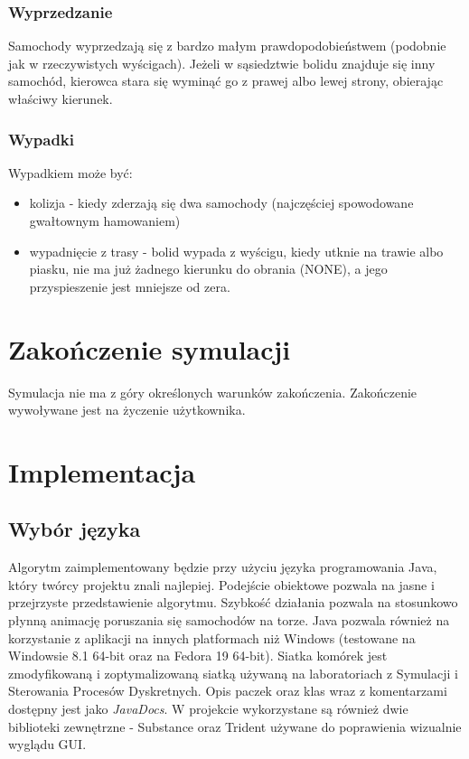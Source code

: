 \documentclass{article}
\begin{document}
\subsubsection{Wyprzedzanie}
Samochody wyprzedzają się z bardzo małym prawdopodobieństwem (podobnie jak w rzeczywistych wyścigach). Jeżeli w sąsiedztwie bolidu znajduje się inny samochód, kierowca stara się wyminąć go z prawej albo lewej strony, obierając właściwy kierunek. 

\subsubsection{Wypadki}
Wypadkiem może być:
\begin{itemize}
\item kolizja - kiedy zderzają się dwa samochody (najczęściej spowodowane gwałtownym hamowaniem)
\item wypadnięcie z trasy - bolid wypada z wyścigu, kiedy utknie na trawie albo piasku, nie ma już żadnego kierunku do obrania (NONE), a jego przyspieszenie jest mniejsze od zera.
\end{itemize}

\section{Zakończenie symulacji}
Symulacja nie ma z góry określonych warunków zakończenia. Zakończenie wywoływane jest na życzenie użytkownika.

\section{Implementacja}
\subsection{Wybór języka}
Algorytm zaimplementowany będzie przy użyciu języka programowania Java, który twórcy projektu znali najlepiej. Podejście obiektowe pozwala na jasne i przejrzyste przedstawienie algorytmu. Szybkość działania pozwala na stosunkowo płynną animację poruszania się samochodów na torze. Java pozwala również na korzystanie z aplikacji na innych platformach niż Windows (testowane na Windowsie 8.1 64-bit oraz na Fedora 19 64-bit). Siatka komórek jest zmodyfikowaną i zoptymalizowaną siatką używaną na laboratoriach z Symulacji i Sterowania Procesów Dyskretnych. Opis paczek oraz klas wraz z komentarzami dostępny jest jako \textit{JavaDocs}. W projekcie wykorzystane są również dwie biblioteki zewnętrzne - Substance oraz Trident używane do poprawienia wizualnie wyglądu GUI.
\end{document}
